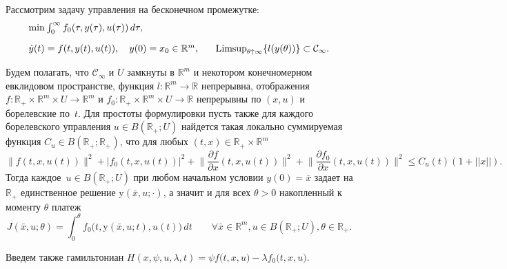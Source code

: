 	Рассмотрим задачу управления на бесконечном промежутке:
$$
\begin{array}{l}
	\min \int_{0}^\infty f_0(\tau,y(\tau),u(\tau))\, d\tau,\\[1em]
\dot{y}(t)=f(t,y(t),u(t)),  \quad y(0)=x_0\in\mathbb{R}^m
,\quad
\ \mathop{\hbox{ \rm{Limsup}}}_{\theta\uparrow\infty} \{l(y(\theta))\}\subset \mathcal{C}_\infty.
\end{array}
$$

Будем полагать, что $\mathcal{C}_\infty$ и $U$  замкнуты в $\mathbb{R}^m$ и некотором конечномерном евклидовом пространстве, функция $l:\mathbb{R}^m\to\mathbb{R}$ непрерывна, 
отображения  $f:\mathbb{R}_+\times\mathbb{R}^m\times U\to\mathbb{R}^m$ и
$f_0:\mathbb{R}_+\times\mathbb{R}^m\times U\to\mathbb{R}$
непрерывны по $(x,u)$ и борелевские по~$t$. 
Для простоты формулировки пусть также для каждого борелевского управления $u\in B(\mathbb{R}_+;U)$ найдется такая локально суммируемая функция $C_u\in B(\mathbb{R}_+;\mathbb{R}_+)$, что  для любых $(t,x)\in\mathbb{R}_+\times\mathbb{R}^m$ 
\[ \|f(t,x,u(t))\|^2+|f_0(t,x,u(t))|^2+\Big\|\frac{\partial f}{\partial x}(t,x,u(t))\Big\|^2+\Big\|\frac{\partial f_0}{\partial x}(t,x,u(t))\Big\|^2\leq C_u(t)(1+||x||).\]
Тогда каждое~$u\in B(\mathbb{R}_+;U)$  при любом начальном условии $y(0)=\bar{x}$ задает на $\mathbb{R}_+$ единственное  решение ${ \mathrm{y}}(\bar{x},u;\cdot)$, а значит и для всех $\theta>0$ накопленный к моменту $\theta$ платеж
\[      	J(\bar{x},u;\theta)=\int_{0}^{\theta} f_0\big(t,{ \mathrm{y}}(\bar{x},u;t),u(t)\big)\,dt\qquad\forall
\bar{x}\in\mathbb{R}^m,u\in B(\mathbb{R}_+;U),\theta\in\mathbb{R}_+. \]

Введем также
гамильтониан
$
H(x,\psi,u,\lambda,t)=\psi f\big(t,x,u\big)-\lambda
f_0\big(t,x,u\big).
$

